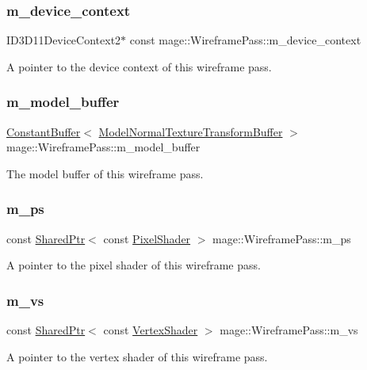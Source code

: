\subsubsection{\texorpdfstring{m\+\_\+device\+\_\+context}{m\_device\_context}}
{\footnotesize\ttfamily I\+D3\+D11\+Device\+Context2$\ast$ const mage\+::\+Wireframe\+Pass\+::m\+\_\+device\+\_\+context\hspace{0.3cm}{\ttfamily [private]}}

A pointer to the device context of this wireframe pass. \hypertarget{classmage_1_1_wireframe_pass_aa7fb7cbba08fe8b4d7defab36d2e82a7}{}\label{classmage_1_1_wireframe_pass_aa7fb7cbba08fe8b4d7defab36d2e82a7} 
\subsubsection{\texorpdfstring{m\+\_\+model\+\_\+buffer}{m\_model\_buffer}}
{\footnotesize\ttfamily \hyperlink{structmage_1_1_constant_buffer}{Constant\+Buffer}$<$ \hyperlink{structmage_1_1_model_normal_texture_transform_buffer}{Model\+Normal\+Texture\+Transform\+Buffer} $>$ mage\+::\+Wireframe\+Pass\+::m\+\_\+model\+\_\+buffer\hspace{0.3cm}{\ttfamily [private]}}

The model buffer of this wireframe pass. \hypertarget{classmage_1_1_wireframe_pass_a39577f12ad9b3f72e703c290cbf46002}{}\label{classmage_1_1_wireframe_pass_a39577f12ad9b3f72e703c290cbf46002} 
\subsubsection{\texorpdfstring{m\+\_\+ps}{m\_ps}}
{\footnotesize\ttfamily const \hyperlink{namespacemage_a1e01ae66713838a7a67d30e44c67703e}{Shared\+Ptr}$<$ const \hyperlink{namespacemage_a27ecaf266420ee7a494d64edc0757129}{Pixel\+Shader} $>$ mage\+::\+Wireframe\+Pass\+::m\+\_\+ps\hspace{0.3cm}{\ttfamily [private]}}

A pointer to the pixel shader of this wireframe pass. \hypertarget{classmage_1_1_wireframe_pass_aa55de3b804055362812bcf775e0dffb4}{}\label{classmage_1_1_wireframe_pass_aa55de3b804055362812bcf775e0dffb4} 
\subsubsection{\texorpdfstring{m\+\_\+vs}{m\_vs}}
{\footnotesize\ttfamily const \hyperlink{namespacemage_a1e01ae66713838a7a67d30e44c67703e}{Shared\+Ptr}$<$ const \hyperlink{classmage_1_1_vertex_shader}{Vertex\+Shader} $>$ mage\+::\+Wireframe\+Pass\+::m\+\_\+vs\hspace{0.3cm}{\ttfamily [private]}}

A pointer to the vertex shader of this wireframe pass. 